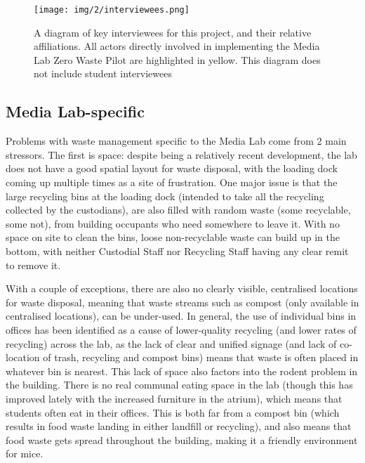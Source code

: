 \documentclass[nofonts,nols,justified,nobib]{tufte-book}
\begin{document}
\begin{figure}
  \caption{A diagram of key interviewees for this project, and their relative affiliations. All actors directly involved in implementing the Media Lab Zero Waste Pilot are highlighted in yellow. This diagram does not include student interviewees}
  \texttt{[image: img/2/interviewees.png]}
  \label{contamination}
\end{figure}

\subsection*{Media Lab-specific}

Problems with waste management specific to the Media Lab come from 2 main stressors. The first is space: despite being a relatively recent development, the lab does not have a good spatial layout for waste disposal, with the loading dock coming up multiple times as a site of frustration. One major issue is that the large recycling bins at the loading dock (intended to take all the recycling collected by the custodians), are also filled with random waste (some recyclable, some not), from building occupants who need somewhere to leave it. With no space on site to clean the bins, loose non-recyclable waste can build up in the bottom, with neither Custodial Staff nor Recycling Staff having any clear remit to remove it.

With a couple of exceptions, there are also no clearly visible, centralised locations for waste disposal, meaning that waste streams such as compost (only available in centralised locations), can be under-used. In general, the use of individual bins in offices has been identified as a cause of lower-quality recycling (and lower rates of recycling) across the lab, as the lack of clear and unified signage (and lack of co-location of trash, recycling and compost bins) means that waste is often placed in whatever bin is nearest. This lack of space also factors into the rodent problem in the building. There is no real communal eating space in the lab (though this has improved lately with the increased furniture in the atrium), which means that students often eat in their offices. This is both far from a compost bin (which results in food waste landing in either landfill or recycling), and also means that food waste gets spread throughout the building, making it a friendly environment for mice.
\end{document}
